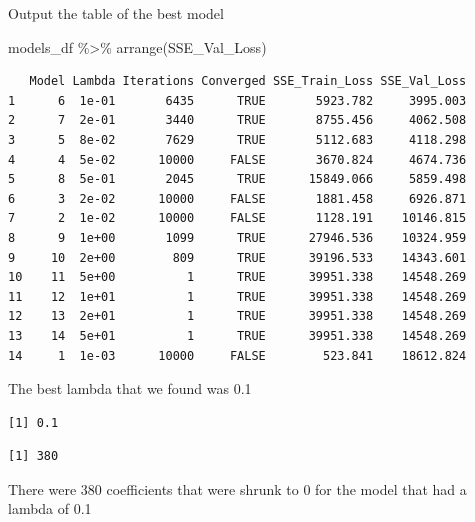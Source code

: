 \documentclass[
  letterpaper,
  DIV=11,
  numbers=noendperiod]{scrartcl}
\newenvironment{Shaded}{\begin{snugshade}}{\end{snugshade}}
\newcommand{\CommentTok}[1]{\textcolor[rgb]{0.37,0.37,0.37}{#1}}
\newcommand{\DecValTok}[1]{\textcolor[rgb]{0.68,0.00,0.00}{#1}}
\newcommand{\FloatTok}[1]{\textcolor[rgb]{0.68,0.00,0.00}{#1}}
\newcommand{\FunctionTok}[1]{\textcolor[rgb]{0.28,0.35,0.67}{#1}}
\newcommand{\NormalTok}[1]{\textcolor[rgb]{0.00,0.23,0.31}{#1}}
\newcommand{\SpecialCharTok}[1]{\textcolor[rgb]{0.37,0.37,0.37}{#1}}
\begin{document}
Output the table of the best model

\begin{Shaded}
\begin{Highlighting}[]
\NormalTok{models\_df }\SpecialCharTok{\%\textgreater{}\%}
  \FunctionTok{arrange}\NormalTok{(SSE\_Val\_Loss)}
\end{Highlighting}
\end{Shaded}

\begin{verbatim}
   Model Lambda Iterations Converged SSE_Train_Loss SSE_Val_Loss
1      6  1e-01       6435      TRUE       5923.782     3995.003
2      7  2e-01       3440      TRUE       8755.456     4062.508
3      5  8e-02       7629      TRUE       5112.683     4118.298
4      4  5e-02      10000     FALSE       3670.824     4674.736
5      8  5e-01       2045      TRUE      15849.066     5859.498
6      3  2e-02      10000     FALSE       1881.458     6926.871
7      2  1e-02      10000     FALSE       1128.191    10146.815
8      9  1e+00       1099      TRUE      27946.536    10324.959
9     10  2e+00        809      TRUE      39196.533    14343.601
10    11  5e+00          1      TRUE      39951.338    14548.269
11    12  1e+01          1      TRUE      39951.338    14548.269
12    13  2e+01          1      TRUE      39951.338    14548.269
13    14  5e+01          1      TRUE      39951.338    14548.269
14     1  1e-03      10000     FALSE        523.841    18612.824
\end{verbatim}

The best lambda that we found was 0.1

\begin{Shaded}
\end{Shaded}

\begin{verbatim}
[1] 0.1
\end{verbatim}

\begin{Shaded}
\end{Shaded}

\begin{verbatim}
[1] 380
\end{verbatim}

There were 380 coefficients that were shrunk to 0 for the model that had
a lambda of 0.1
\end{document}
